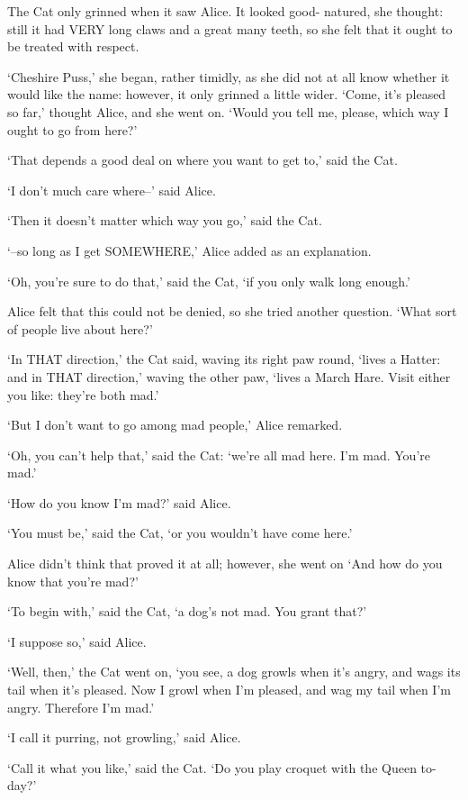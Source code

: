 \documentclass[12pt]{book}
\begin{document}
  The Cat only grinned when it saw Alice.  It looked good-
natured, she thought:  still it had VERY long claws and a great
many teeth, so she felt that it ought to be treated with respect.

  `Cheshire Puss,' she began, rather timidly, as she did not at
all know whether it would like the name:  however, it only
grinned a little wider.  `Come, it's pleased so far,' thought
Alice, and she went on.  `Would you tell me, please, which way I
ought to go from here?'

  `That depends a good deal on where you want to get to,' said
the Cat.

  `I don't much care where--' said Alice.

  `Then it doesn't matter which way you go,' said the Cat.

  `--so long as I get SOMEWHERE,' Alice added as an explanation.

  `Oh, you're sure to do that,' said the Cat, `if you only walk
long enough.'

  Alice felt that this could not be denied, so she tried another
question.  `What sort of people live about here?'

  `In THAT direction,' the Cat said, waving its right paw round,
`lives a Hatter:  and in THAT direction,' waving the other paw,
`lives a March Hare.  Visit either you like:  they're both mad.'

  `But I don't want to go among mad people,' Alice remarked.

  `Oh, you can't help that,' said the Cat:  `we're all mad here.
I'm mad.  You're mad.'

  `How do you know I'm mad?' said Alice.

  `You must be,' said the Cat, `or you wouldn't have come here.'

  Alice didn't think that proved it at all; however, she went on
`And how do you know that you're mad?'

  `To begin with,' said the Cat, `a dog's not mad.  You grant
that?'

  `I suppose so,' said Alice.

  `Well, then,' the Cat went on, `you see, a dog growls when it's
angry, and wags its tail when it's pleased.  Now I growl when I'm
pleased, and wag my tail when I'm angry.  Therefore I'm mad.'

  `I call it purring, not growling,' said Alice.

  `Call it what you like,' said the Cat.  `Do you play croquet
with the Queen to-day?'
\end{document}
